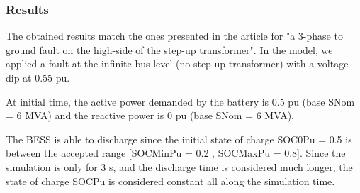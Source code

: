 \documentclass[a4paper, 12pt]{report}
\begin{document}
\subsubsection{Results}
The obtained results match the ones presented in the article for "a 3-phase to ground fault on the high-side of the step-up transformer". In the model, we applied a fault at the infinite bus level (no step-up transformer) with a voltage dip at 0.55 pu.


At initial time, the active power demanded by the battery is 0.5 pu (base SNom = 6 MVA) and the reactive power is 0 pu (base SNom = 6 MVA).

The BESS is able to discharge since the initial state of charge SOC0Pu = 0.5 is between the accepted range [SOCMinPu = 0.2 , SOCMaxPu = 0.8]. Since the simulation is only for 3 s, and the discharge time is considered much longer, the state of charge SOCPu is considered constant all along the simulation time.
\end{document}
